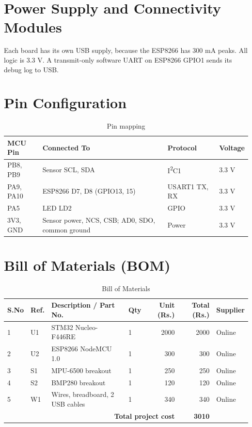 \documentclass[12pt,a4paper]{report}
\newcommand{\rupee}{Rs.}  %
\begin{document}
\section{Power Supply and Connectivity Modules}
Each board has its own USB supply, because the ESP8266 \cite{esp8266} has 300 mA peaks. All logic is 3.3 V. A transmit-only software UART on ESP8266 GPIO1 sends its debug log to USB.

\section{Pin Configuration}
\begin{table}[H]
\centering
\caption{Pin mapping}
\label{tab:pins}
\small
\begin{tabularx}{\textwidth}{lXll}
\toprule
\textbf{MCU Pin} & \textbf{Connected To} & \textbf{Protocol} & \textbf{Voltage}\\
\midrule
PB8, PB9 & Sensor SCL, SDA & I\textsuperscript{2}C1 & 3.3 V\\
PA9, PA10 & ESP8266 D7, D8 (GPIO13, 15) & USART1 TX, RX & 3.3 V\\
PA5 & LED LD2 & GPIO & 3.3 V\\
3V3, GND & Sensor power, NCS, CSB; AD0, SDO, common ground & Power & 3.3 V\\
\bottomrule
\end{tabularx}
\end{table}

\section{Bill of Materials (BOM)}
\begin{table}[H]
\centering
\caption{Bill of Materials}
\label{tab:bom}
\small
\begin{tabularx}{\textwidth}{llXlrrl}
\toprule
\textbf{S.No} & \textbf{Ref.} & \textbf{Description / Part No.} & \textbf{Qty} & \textbf{Unit (\rupee)} & \textbf{Total (\rupee)} & \textbf{Supplier}\\
\midrule
1 & U1 & STM32 Nucleo-F446RE & 1 & 2000 & 2000 & Online\\
2 & U2 & ESP8266 NodeMCU 1.0 & 1 & 300 & 300 & Online\\
3 & S1 & MPU-6500 breakout & 1 & 250 & 250 & Online\\
4 & S2 & BMP280 breakout & 1 & 120 & 120 & Online\\
5 & W1 & Wires, breadboard, 2 USB cables & 1 & 340 & 340 & Online\\
\midrule
\multicolumn{5}{r}{\textbf{Total project cost}} & \textbf{3010} & \\
\bottomrule
\end{tabularx}
\end{table}
\end{document}

